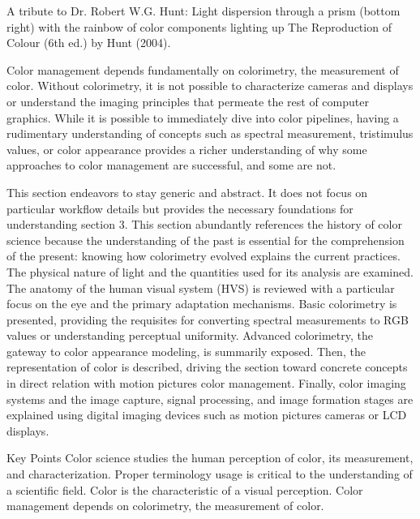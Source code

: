 A tribute to Dr. Robert W.G. Hunt: Light dispersion through a prism (bottom right) with the rainbow of color components lighting up The Reproduction of Colour (6th ed.) by Hunt (2004).

Color management depends fundamentally on colorimetry, the measurement of color. Without colorimetry, it is not possible to characterize cameras and displays or understand the imaging principles that permeate the rest of computer graphics. While it is possible to immediately dive into color pipelines, having a rudimentary understanding of concepts such as spectral measurement, tristimulus values, or color appearance provides a richer understanding of why some approaches to color management are successful, and some are not.

This section endeavors to stay generic and abstract. It does not focus on particular workflow details but provides the necessary foundations for understanding section 3. This section abundantly references the history of color science because the understanding of the past is essential for the comprehension of the present: knowing how colorimetry evolved explains the current practices. The physical nature of light and the quantities used for its analysis are examined. The anatomy of the human visual system (HVS) is reviewed with a particular focus on the eye and the primary adaptation mechanisms. Basic colorimetry is presented, providing the requisites for converting spectral measurements to RGB values or understanding perceptual uniformity. Advanced colorimetry, the gateway to color appearance modeling, is summarily exposed. Then, the representation of color is described, driving the section toward concrete concepts in direct relation with motion pictures color management. Finally, color imaging systems and the image capture, signal processing, and image formation stages are explained using digital imaging devices such as motion pictures cameras or LCD displays.

Key Points
Color science studies the human perception of color, its measurement, and characterization.
Proper terminology usage is critical to the understanding of a scientific field.
Color is the characteristic of a visual perception.
Color management depends on colorimetry, the measurement of color.
